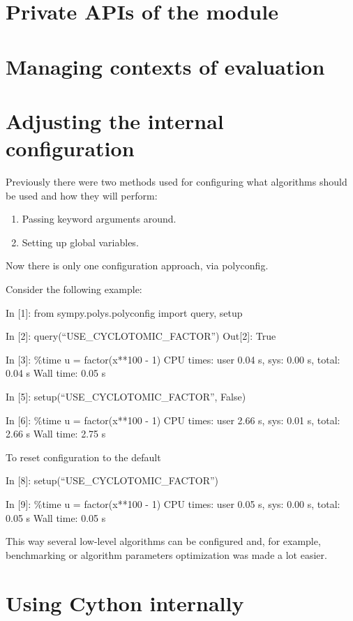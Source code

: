 \section{Private APIs of the module}


\section{Managing contexts of evaluation}


\section{Adjusting the internal configuration}

Previously there were two methods used for configuring what
algorithms should be used and how they will perform:
\begin{enumerate}
\item {} 
Passing keyword arguments around.

\item {} 
Setting up global variables.

\end{enumerate}

Now there is only one configuration approach, via polyconfig.

Consider the following example:

In {[}1{]}: from sympy.polys.polyconfig import query, setup

In {[}2{]}: query(``USE\_CYCLOTOMIC\_FACTOR'')
Out{[}2{]}: True

In {[}3{]}: \%time u = factor(x**100 - 1)
CPU times: user 0.04 s, sys: 0.00 s, total: 0.04 s
Wall time: 0.05 s

In {[}5{]}: setup(``USE\_CYCLOTOMIC\_FACTOR'', False)

In {[}6{]}: \%time u = factor(x**100 - 1)
CPU times: user 2.66 s, sys: 0.01 s, total: 2.66 s
Wall time: 2.75 s

To reset configuration to the default

In {[}8{]}: setup(``USE\_CYCLOTOMIC\_FACTOR'')

In {[}9{]}: \%time u = factor(x**100 - 1)
CPU times: user 0.05 s, sys: 0.00 s, total: 0.05 s
Wall time: 0.05 s

This way several low-level algorithms can be configured and, for
example, benchmarking or algorithm parameters optimization was
made a lot easier.
\section{Using Cython internally}\label{thesis-cython}

